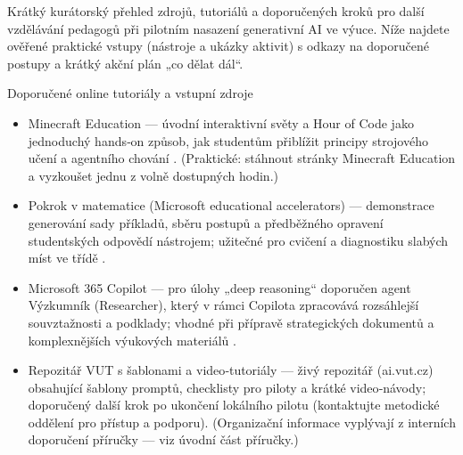 Krátký kurátorský přehled zdrojů, tutoriálů a doporučených kroků pro další vzdělávání pedagogů při pilotním nasazení generativní AI ve výuce. Níže najdete ověřené praktické vstupy (nástroje a ukázky aktivit) s odkazy na doporučené postupy a krátký akční plán „co dělat dál“.

Doporučené online tutoriály a vstupní zdroje
\begin{itemize}
  \item Minecraft Education — úvodní interaktivní světy a Hour of Code jako jednoduchý hands‑on způsob, jak studentům přiblížit principy strojového učení a agentního chování \cite{kb_ai_101_tipu_pdf_04e4a115_page_15_2}. (Praktické: stáhnout stránky Minecraft Education a vyzkoušet jednu z volně dostupných hodin.)
  \item Pokrok v matematice (Microsoft educational accelerators) — demonstrace generování sady příkladů, sběru postupů a předběžného opravení studentských odpovědí nástrojem; užitečné pro cvičení a diagnostiku slabých míst ve třídě \cite{kb_ai_101_tipu_pdf_04e4a115_page_8_1}.
  \item Microsoft 365 Copilot — pro úlohy „deep reasoning“ doporučen agent Výzkumník (Researcher), který v rámci Copilota zpracovává rozsáhlejší souvztažnosti a podklady; vhodné při přípravě strategických dokumentů a komplexnějších výukových materiálů \cite{kb_ai_101_tipu_pdf_04e4a115_page_48_1}.
  \item Repozitář VUT s šablonami a video‑tutoriály — živý repozitář (ai.vut.cz) obsahující šablony promptů, checklisty pro piloty a krátké video‑návody; doporučený další krok po ukončení lokálního pilotu (kontaktujte metodické oddělení pro přístup a podporu). (Organizační informace vyplývají z interních doporučení příručky — viz úvodní část příručky.)
\end{itemize}

